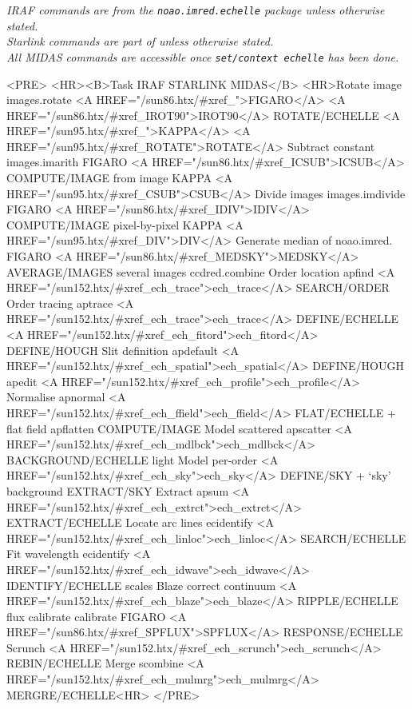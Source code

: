 \begin{htmlonly}
{\sl
IRAF commands are from the {\tt noao.imred.echelle} package unless otherwise
stated.\\
Starlink commands are part of  unless otherwise stated.\\
All MIDAS commands are accessible once {\tt set/context echelle} has been
done.}
\begin{rawhtml}
<PRE>
<HR><B>Task               IRAF             STARLINK       MIDAS</B>
<HR>Rotate image       images.rotate    <A HREF="/sun86.htx/#xref_">FIGARO</A> <A HREF="/sun86.htx/#xref_IROT90">IROT90</A>  ROTATE/ECHELLE
                                    <A HREF="/sun95.htx/#xref_">KAPPA</A> <A HREF="/sun95.htx/#xref_ROTATE">ROTATE</A>
Subtract constant  images.imarith   FIGARO <A HREF="/sun86.htx/#xref_ICSUB">ICSUB</A>   COMPUTE/IMAGE
from image                          KAPPA <A HREF="/sun95.htx/#xref_CSUB">CSUB</A>
Divide images      images.imdivide  FIGARO <A HREF="/sun86.htx/#xref_IDIV">IDIV</A>    COMPUTE/IMAGE
pixel-by-pixel                      KAPPA <A HREF="/sun95.htx/#xref_DIV">DIV</A>
Generate median of noao.imred.      FIGARO <A HREF="/sun86.htx/#xref_MEDSKY">MEDSKY</A>  AVERAGE/IMAGES
several images     ccdred.combine
Order location     apfind           <A HREF="/sun152.htx/#xref_ech_trace">ech_trace</A>      SEARCH/ORDER
Order tracing      aptrace          <A HREF="/sun152.htx/#xref_ech_trace">ech_trace</A>      DEFINE/ECHELLE
                                    <A HREF="/sun152.htx/#xref_ech_fitord">ech_fitord</A>     DEFINE/HOUGH
Slit definition    apdefault        <A HREF="/sun152.htx/#xref_ech_spatial">ech_spatial</A>    DEFINE/HOUGH
                   apedit           <A HREF="/sun152.htx/#xref_ech_profile">ech_profile</A>
Normalise          apnormal         <A HREF="/sun152.htx/#xref_ech_ffield">ech_ffield</A>     FLAT/ECHELLE +
flat field         apflatten                       COMPUTE/IMAGE
Model scattered    apscatter        <A HREF="/sun152.htx/#xref_ech_mdlbck">ech_mdlbck</A>     BACKGROUND/ECHELLE
light
Model per-order                     <A HREF="/sun152.htx/#xref_ech_sky">ech_sky</A>        DEFINE/SKY +
`sky' background                                   EXTRACT/SKY
Extract            apsum            <A HREF="/sun152.htx/#xref_ech_extrct">ech_extrct</A>     EXTRACT/ECHELLE
Locate arc lines   ecidentify       <A HREF="/sun152.htx/#xref_ech_linloc">ech_linloc</A>     SEARCH/ECHELLE
Fit wavelength     ecidentify       <A HREF="/sun152.htx/#xref_ech_idwave">ech_idwave</A>     IDENTIFY/ECHELLE
scales
Blaze correct      continuum        <A HREF="/sun152.htx/#xref_ech_blaze">ech_blaze</A>      RIPPLE/ECHELLE
flux calibrate     calibrate        FIGARO <A HREF="/sun86.htx/#xref_SPFLUX">SPFLUX</A>  RESPONSE/ECHELLE
Scrunch                             <A HREF="/sun152.htx/#xref_ech_scrunch">ech_scrunch</A>    REBIN/ECHELLE
Merge              scombine         <A HREF="/sun152.htx/#xref_ech_mulmrg">ech_mulmrg</A>     MERGRE/ECHELLE<HR>
</PRE>
\end{rawhtml}
\end{htmlonly}

